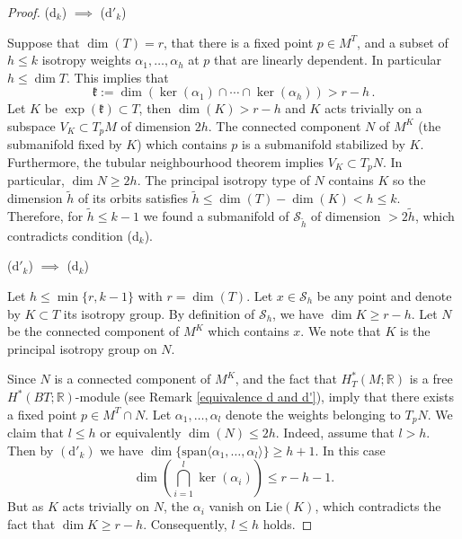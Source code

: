 \documentclass[12pt,a4paper]{amsart}
\newcommand{\RR}{\mathbb{R}}
\theoremstyle{plain}
\theoremstyle{definition}
\begin{document}
\begin{proof}
 (d$_k$) $\implies$ ($\text{d}'_{k}$) 

Suppose that $\dim(T)=r$, that there is a fixed point $p\in M^T$, and a subset of $h\leq k$ isotropy weights $\alpha_1,\ldots,\alpha_h$ at $p$ that are linearly dependent. In particular $h\leq \dim T$. This implies that 
$$
\mathfrak{k}:=\dim(\ker(\alpha_1)\cap \cdots \cap \ker(\alpha_h))> r-h\,.
$$
Let $K$ be $\exp(\mathfrak{k})\subset T$, then $\dim(K)>r-h$ and $K$ acts trivially on a subspace $V_K \subset T_pM$ of dimension $2h$.
The connected component $N$ of $M^K$ (the submanifold fixed by $K$) which contains $p$ is a submanifold stabilized by $K$. Furthermore, the tubular neighbourhood theorem implies $V_K\subset T_pN$. In particular, $\dim N\geq 2h$.
The principal isotropy type of $N$ contains $K$ so the dimension $\widetilde{h}$ of its orbits satisfies $\widetilde{h}\leq \dim(T)-\dim(K)<h\leq k$. Therefore, for $\widetilde{h}\leq k-1$ we found a submanifold of $\mathcal{S}_{\widetilde{h}}$ of dimension $>2\widetilde{h}$, which contradicts condition (d$_k$).

\vspace{0.3cm}
 ($\text{d}'_{k}$) $\implies$ (d$_k$) 
 
Let $h\leq \min\{r,k-1\}$ with $r=\dim(T)$. Let $x\in \mathcal{S}_h$ be any point and denote by $K\subset T$ its isotropy group. By definition of $\mathcal{S}_h$, we have $\dim K\geq r-h$. Let $N$ be the connected component of $M^K$ which contains $x$. We note that $K$ is the principal isotropy group on $N$.
 
Since $N$ is a connected component of $M^K$, \cite[Threorem 11.6.1]{MR1689252} and the fact that $H_T^*(M;\RR)$ is a free $H^*(BT;\RR)$-module (see Remark \ref{equivalence d and d'}), imply that there exists
a fixed point $p\in M^T\cap N$. Let $\alpha_1,\ldots,\alpha_l$ denote the weights belonging to $T_p N$. We claim that $l\leq h$ or equivalently $\dim(N)\leq 2h$.
Indeed, assume that $l>h$. Then by $(\text{d}'_k)$ we have 
$\dim\{\text{span}\langle \alpha_1,\ldots, \alpha_l \rangle\} \geq h+1$.
In this case
\[\dim\left(\displaystyle\bigcap_{i=1}^l\ker(\alpha_i)\right)\leq r-h-1.\]
But as $K$ acts trivially on $N$, the $\alpha_i$ vanish on $\mathrm{Lie}(K)$, which contradicts the fact that $\dim K\geq r-h$. Consequently, $l\leq h$ holds.


\end{proof}
\end{document}
